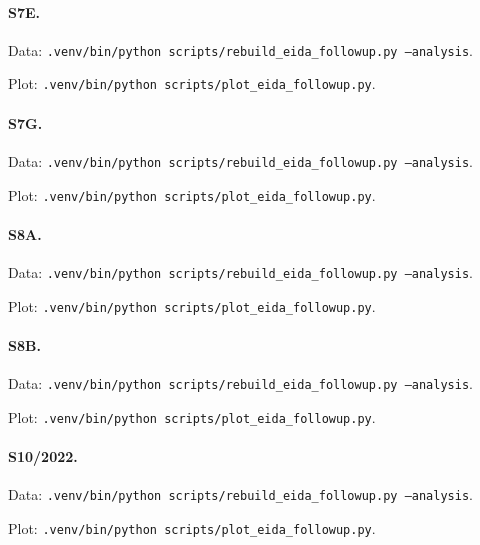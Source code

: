 \paragraph{S7E.}
\par Data: \texttt{.venv/bin/python scripts/rebuild\_eida\_followup.py --analysis}.
\par Plot: \texttt{.venv/bin/python scripts/plot\_eida\_followup.py}.
\par{}
\paragraph{S7G.}
\par Data: \texttt{.venv/bin/python scripts/rebuild\_eida\_followup.py --analysis}.
\par Plot: \texttt{.venv/bin/python scripts/plot\_eida\_followup.py}.
\par{}
\paragraph{S8A.}
\par Data: \texttt{.venv/bin/python scripts/rebuild\_eida\_followup.py --analysis}.
\par Plot: \texttt{.venv/bin/python scripts/plot\_eida\_followup.py}.
\par{}
\par{}
\paragraph{S8B.}
\par Data: \texttt{.venv/bin/python scripts/rebuild\_eida\_followup.py --analysis}.
\par Plot: \texttt{.venv/bin/python scripts/plot\_eida\_followup.py}.
\par{}
\par{}
\paragraph{S10/2022.}
\par Data: \texttt{.venv/bin/python scripts/rebuild\_eida\_followup.py --analysis}.
\par Plot: \texttt{.venv/bin/python scripts/plot\_eida\_followup.py}.
\par{}
